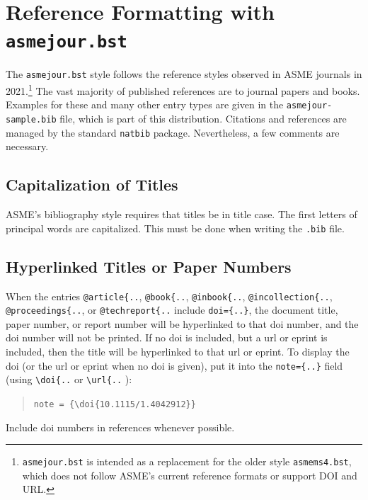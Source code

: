 \documentclass[subscriptcorrection,upint,varvw,barcolor=Goldenrod3,mathalfa=cal=euler,balance,hyphenate,french,pdf-a]{asmejour} %
\begin{document}
\section{Reference Formatting with \texttt{asmejour.bst}}

The {\upshape\texttt{asmejour.bst}}  style follows the reference styles observed in ASME journals in 2021.\footnote{\texttt{asmejour.bst} is intended as a replacement for the older style \texttt{asmems4.bst}, which does not follow ASME's current reference formats or support DOI and URL.} The vast majority of published references are to journal papers and books. Examples for these and many other entry types are given in the \texttt{asmejour-sample.bib} file, which is part of this distribution. Citations and references are managed by the standard \texttt{natbib} package.
Nevertheless, a few comments are necessary. 

\subsection{Capitalization of Titles} ASME's bibliography style requires that titles be in title case. The first letters of principal words are capitalized. This must be done when writing the \texttt{.bib} file.

\subsection{Hyperlinked Titles or Paper Numbers} When the entries \verb|@article{..|, \verb|@book{..|, \verb|@inbook{..|, \verb|@incollection{..|, \verb|@proceedings{..|, or \verb|@techreport{..| include \verb|doi={..}|, the document title, paper number, or report number will be hyperlinked to that doi number, and the doi number will not be printed. If no doi is included, but a url or eprint is included, then the title will be hyperlinked to that url or eprint. To display the doi (or the url or eprint when no doi is given), put it into the \verb|note={..}| field (using \verb|\doi{..| or \verb|\url{..| ):
\begin{quote}
\verb|note = {\doi{10.1115/1.4042912}}|
\end{quote}
Include doi numbers in references whenever possible.


\end{document}

